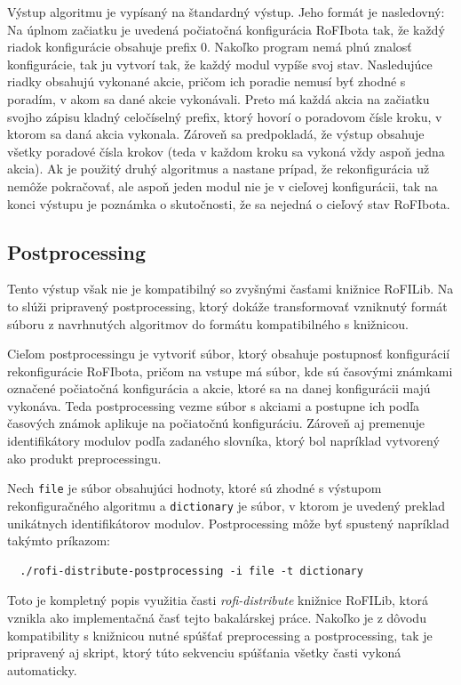 \documentclass[
  digital, %
  oneside, %
  notable,   %
  lof,     %
  nolot,     %
]{fithesis3}
\begin{document}
Výstup algoritmu je vypísaný na štandardný výstup. Jeho formát je nasledovný: Na úplnom začiatku je uvedená počiatočná konfigurácia RoFIbota tak, že každý riadok konfigurácie obsahuje prefix $0$. Nakoľko program nemá plnú znalosť konfigurácie, tak ju vytvorí tak, že každý modul vypíše svoj stav. Nasledujúce riadky obsahujú vykonané akcie, pričom ich poradie nemusí byť zhodné s poradím, v akom sa dané akcie vykonávali. Preto má každá akcia na začiatku svojho zápisu kladný celočíselný prefix, ktorý hovorí o poradovom čísle kroku, v ktorom sa daná akcia vykonala. Zároveň sa predpokladá, že výstup obsahuje všetky poradové čísla krokov (teda v každom kroku sa vykoná vždy aspoň jedna akcia). Ak je použitý druhý algoritmus a nastane prípad, že rekonfigurácia už nemôže pokračovať, ale aspoň jeden modul nie je v cieľovej konfigurácii, tak na konci výstupu je poznámka o skutočnosti, že sa nejedná o cieľový stav RoFIbota. 

\subsection{Postprocessing}
Tento výstup však nie je kompatibilný so zvyšnými časťami knižnice RoFILib. Na to slúži pripravený postprocessing, ktorý dokáže transformovať vzniknutý formát súboru z navrhnutých algoritmov do formátu kompatibilného s knižnicou. 

Cieľom postprocessingu je vytvoriť súbor, ktorý obsahuje postupnosť konfigurácií rekonfigurácie RoFIbota, pričom na vstupe má súbor, kde sú časovými známkami označené počiatočná konfigurácia a akcie, ktoré sa na danej konfigurácii majú vykonáva. Teda postprocessing vezme súbor s akciami a postupne ich podľa časových známok aplikuje na počiatočnú konfiguráciu. Zároveň aj premenuje identifikátory modulov podľa zadaného slovníka, ktorý bol napríklad vytvorený ako produkt preprocessingu. 

Nech \texttt{file} je súbor obsahujúci hodnoty, ktoré sú zhodné s výstupom rekonfiguračného algoritmu a \texttt{dictionary} je súbor, v ktorom je uvedený preklad unikátnych identifikátorov modulov. Postprocessing môže byť spustený napríklad takýmto príkazom: 
\begin{verbatim}
  ./rofi-distribute-postprocessing -i file -t dictionary
\end{verbatim}

Toto je kompletný popis využitia časti \textit{rofi-distribute} knižnice RoFILib, ktorá vznikla ako implementačná časť tejto bakalárskej práce. Nakoľko je z dôvodu kompatibility s knižnicou nutné spúšťať preprocessing a postprocessing, tak je pripravený aj skript, ktorý túto sekvenciu spúšťania všetky časti vykoná automaticky. 
\end{document}
